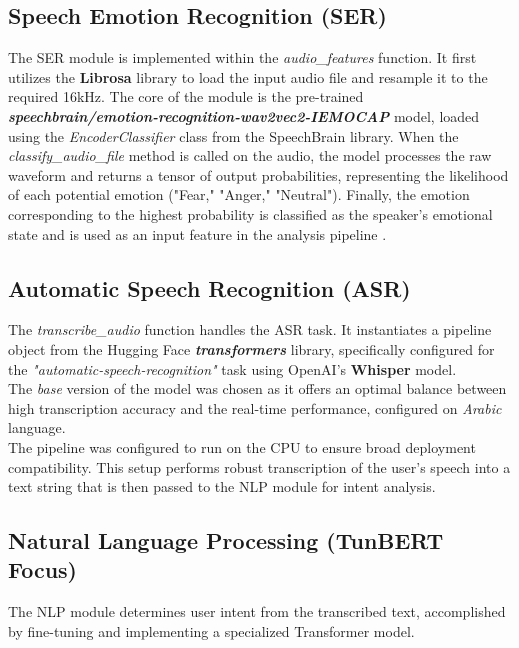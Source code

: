 \documentclass[12pt,a4paper,oneside,english]{book}
\begin{document}
{\subsection{Speech Emotion Recognition (SER)}
\label{subsec:ser_implementation}
The SER module is implemented within the \textit{audio\_features} function. It first utilizes the \textbf{Librosa} library to load the input audio file and resample it to the required 16kHz. 
The core of the module is the pre-trained \textbf{\textit{speechbrain/emotion-recognition-wav2vec2-IEMOCAP}} model, loaded using the \textit{EncoderClassifier} class from the SpeechBrain library. 
 When the \textit{classify\_audio\_file} method is called on the audio, the model processes the raw waveform and returns a tensor of output probabilities, representing the likelihood of each potential emotion ("Fear," "Anger," "Neutral").
Finally, the emotion corresponding to the highest probability is classified as the speaker's emotional state and is used as an input feature in the analysis pipeline .

\subsection{Automatic Speech Recognition (ASR)}
\label{subsec:asr_implementation}
The \textit{transcribe\_audio} function handles the ASR task. It instantiates a pipeline object from the Hugging Face \textbf{\textit{transformers}} library, specifically configured for the \textit{"automatic-speech-recognition"} task using OpenAI's \textbf{Whisper} model.
\\The \textit{base} version of the model was chosen as it offers an optimal balance between high transcription accuracy and the real-time performance, configured on \textit{Arabic} language.
\\The pipeline was configured to run on the CPU to ensure broad deployment compatibility. 
This setup performs robust transcription of the user's speech into a text string that is then passed to the NLP module for intent analysis.

\subsection{Natural Language Processing (TunBERT Focus)}
\label{sec:nlp_tunbert_implementation}
The NLP module determines user intent from the transcribed text, accomplished by fine-tuning and implementing a specialized Transformer model.

}
\end{document}

